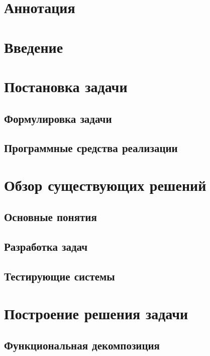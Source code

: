 





\chapter*{Аннотация}


\renewcommand{\contentsname}{Содержание}
\tableofcontents

\chapter*{Введение}



\chapter{Постановка задачи}
\section{Формулировка задачи}

\section{Программные средства реализации}


\chapter{Обзор существующих решений}
\section{Основные понятия}

\section{Разработка задач}

\section{Тестирующие системы}


\chapter{Построение решения задачи}
\section{Функциональная декомпозиция}

